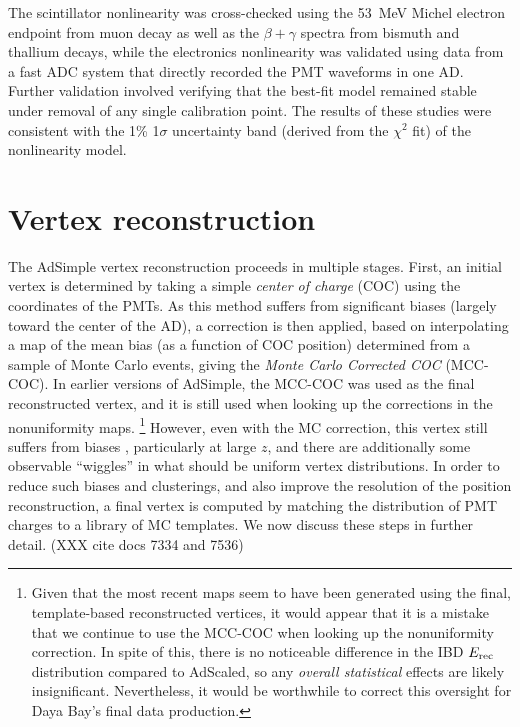 \documentclass[../thesis.tex]{subfiles}
\begin{document}
The scintillator nonlinearity was cross-checked using the 53~MeV Michel electron
endpoint from muon decay as well as the $\beta+\gamma$ spectra from bismuth and
thallium decays, while the electronics nonlinearity was validated using data
from a fast ADC system that directly recorded the PMT waveforms in one
AD. Further validation involved verifying that the best-fit model remained
stable under removal of any single calibration point. The results of these
studies were consistent with the 1\% 1$\sigma$ uncertainty band (derived from
the $\chi^2$ fit) of the nonlinearity model.

\section{Vertex reconstruction}
\label{sec:reconVertex}

The AdSimple vertex reconstruction proceeds in multiple stages. First, an
initial vertex is determined by taking a simple \emph{center of charge} (COC)
using the coordinates of the PMTs. As this method suffers from significant
biases (largely toward the center of the AD), a correction is then applied,
based on interpolating a map of the mean bias (as a function of COC position)
determined from a sample of Monte Carlo events, giving the \emph{Monte Carlo
  Corrected COC} (MCC-COC). In earlier versions of AdSimple, the MCC-COC was
used as the final reconstructed vertex, and it is still used when looking up the
corrections in the nonuniformity maps. \footnote{Given that the most recent maps
  seem to have been generated using the final, template-based reconstructed
  vertices, it would appear that it is a mistake that we continue to use the
  MCC-COC when looking up the nonuniformity correction. In spite of this, there
  is no noticeable difference in the IBD $E_\mathrm{rec}$ distribution compared to
  AdScaled, so any \emph{overall statistical} effects are likely
  insignificant. Nevertheless, it would be worthwhile to correct this oversight
  for Daya Bay's final data production.} However, even with the MC correction,
this vertex still suffers from biases , particularly at large $z$, and there are
additionally some observable ``wiggles'' in what should be uniform vertex
distributions. In order to reduce such biases and clusterings, and also improve
the resolution of the position reconstruction, a final vertex is computed by
matching the distribution of PMT charges to a library of MC templates. We now
discuss these steps in further detail. (XXX cite docs 7334 and 7536)
\end{document}
